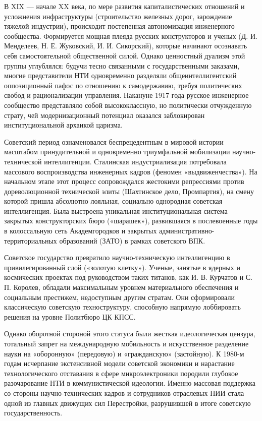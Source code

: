 В XIX --- начале XX века, по мере развития капиталистических отношений и усложнения инфраструктуры (строительство железных дорог, зарождение тяжелой индустрии), происходит постепенная автономизация инженерного сообщества. Формируется мощная плеяда русских конструкторов и ученых (Д. И. Менделеев, Н. Е. Жуковский, И. И. Сикорский), которые начинают осознавать себя самостоятельной общественной силой. Однако ценностный дуализм этой группы углублялся: будучи тесно связанными с государственными заказами, многие представители НТИ одновременно разделяли общеинтеллигентский оппозиционный пафос по отношению к самодержавию, требуя политических свобод и рационализации управления. Накануне 1917 года русское инженерное сообщество представляло собой высококлассную, но политически отчужденную страту, чей модернизационный потенциал оказался заблокирован институциональной архаикой царизма.

Советский период ознаменовался беспрецедентным в мировой истории масштабом принудительной и одновременно триумфальной мобилизации научно-технической интеллигенции. Сталинская индустриализация потребовала массового воспроизводства инженерных кадров (феномен «выдвиженчества»). На начальном этапе этот процесс сопровождался жестокими репрессиями против дореволюционной технической элиты (Шахтинское дело, Промпартия), на смену которой пришла абсолютно лояльная, социально однородная советская интеллигенция. Была выстроена уникальная институциональная система закрытых конструкторских бюро («шарашек»), развившаяся в послевоенные годы в колоссальную сеть Академгородков и закрытых административно-территориальных образований (ЗАТО) в рамках советского ВПК.

Советское государство превратило научно-техническую интеллигенцию в привилегированный слой («золотую клетку»). Ученые, занятые в ядерных и космических проектах под руководством таких титанов, как И. В. Курчатов и С. П. Королев, обладали максимальным уровнем материального обеспечения и социальным престижем, недоступным другим стратам. Они сформировали классическую советскую техноструктуру, способную напрямую лоббировать решения на уровне Политбюро ЦК КПСС. 

Однако оборотной стороной этого статуса были жесткая идеологическая цензура, тотальный запрет на международную мобильность и искусственное разделение науки на «оборонную» (передовую) и «гражданскую» (застойную). К 1980-м годам исчерпание экстенсивной модели советской экономики и нарастание технологического отставания в сфере микроэлектроники породили глубокое разочарование НТИ в коммунистической идеологии. Именно массовая поддержка со стороны научно-технических кадров и сотрудников отраслевых НИИ стала одной из главных движущих сил Перестройки, разрушившей в итоге советскую государственность.